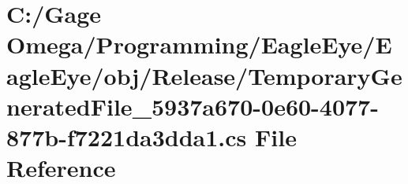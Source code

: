 \hypertarget{_release_2_temporary_generated_file__5937a670-0e60-4077-877b-f7221da3dda1_8cs}{}\section{C\+:/\+Gage Omega/\+Programming/\+Eagle\+Eye/\+Eagle\+Eye/obj/\+Release/\+Temporary\+Generated\+File\+\_\+5937a670-\/0e60-\/4077-\/877b-\/f7221da3dda1.cs File Reference}
\label{_release_2_temporary_generated_file__5937a670-0e60-4077-877b-f7221da3dda1_8cs}
